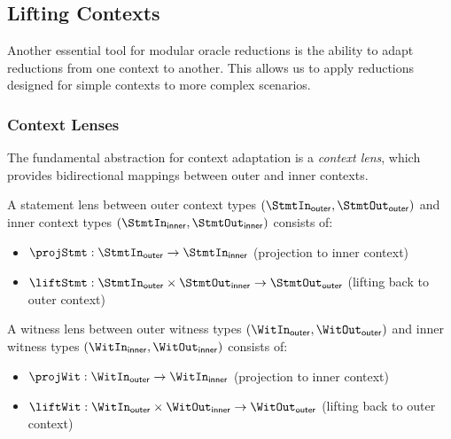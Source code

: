 \begin{theorem}
    \label{thm:knowledge_soundness_compose}
\end{theorem}

\subsection{Lifting Contexts}\label{sec:lifting_contexts}

Another essential tool for modular oracle reductions is the ability to adapt reductions from one context to another. This allows us to apply reductions designed for simple contexts to more complex scenarios.

\subsubsection{Context Lenses}

The fundamental abstraction for context adaptation is a \emph{context lens}, which provides bidirectional mappings between outer and inner contexts.

\begin{definition}
    \label{def:statement_lens}
    A statement lens between outer context types $(\StmtIn_{\mathsf{outer}}, \StmtOut_{\mathsf{outer}})$ and inner context types $(\StmtIn_{\mathsf{inner}}, \StmtOut_{\mathsf{inner}})$ consists of:
    \begin{itemize}
        \item $\projStmt : \StmtIn_{\mathsf{outer}} \to \StmtIn_{\mathsf{inner}}$ (projection to inner context)
        \item $\liftStmt : \StmtIn_{\mathsf{outer}} \times \StmtOut_{\mathsf{inner}} \to \StmtOut_{\mathsf{outer}}$ (lifting back to outer context)
    \end{itemize}
\end{definition}

\begin{definition}
    \label{def:witness_lens}
    A witness lens between outer witness types $(\WitIn_{\mathsf{outer}}, \WitOut_{\mathsf{outer}})$ and inner witness types $(\WitIn_{\mathsf{inner}}, \WitOut_{\mathsf{inner}})$ consists of:
    \begin{itemize}
        \item $\projWit : \WitIn_{\mathsf{outer}} \to \WitIn_{\mathsf{inner}}$ (projection to inner context)
        \item $\liftWit : \WitIn_{\mathsf{outer}} \times \WitOut_{\mathsf{inner}} \to \WitOut_{\mathsf{outer}}$ (lifting back to outer context)
    \end{itemize}
\end{definition}

